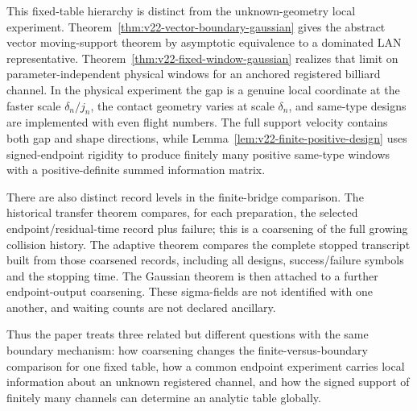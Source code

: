 This fixed-table hierarchy is distinct from the unknown-geometry local
experiment.  Theorem~\ref{thm:v22-vector-boundary-gaussian} gives the abstract
vector moving-support theorem by asymptotic equivalence to a dominated LAN
representative.  Theorem~\ref{thm:v22-fixed-window-gaussian} realizes that
limit on parameter-independent physical windows for an anchored registered
billiard channel.  In the physical experiment the gap is a genuine local
coordinate at the faster scale $\delta_n/j_n$, the contact geometry varies at
scale $\delta_n$, and same-type designs are implemented with even flight
numbers.  The full support velocity contains both gap and shape directions,
while Lemma~\ref{lem:v22-finite-positive-design} uses signed-endpoint rigidity
to produce finitely many positive same-type windows with a positive-definite
summed information matrix.

There are also distinct record levels in the finite-bridge comparison.  The
historical transfer theorem compares, for each preparation, the selected
endpoint/residual-time record plus failure; this is a coarsening of the full
growing collision history.  The adaptive theorem compares the complete
stopped transcript built from those coarsened records, including all designs,
success/failure symbols and the stopping time.  The Gaussian theorem is then
attached to a further endpoint-output coarsening.  These sigma-fields are not
identified with one another, and waiting counts are not declared ancillary.

Thus the paper treats three related but different questions with the same
boundary mechanism: how coarsening changes the finite-versus-boundary
comparison for one fixed table, how a common endpoint experiment carries
local information about an unknown registered channel, and how the signed
support of finitely many channels can determine an analytic table globally.
